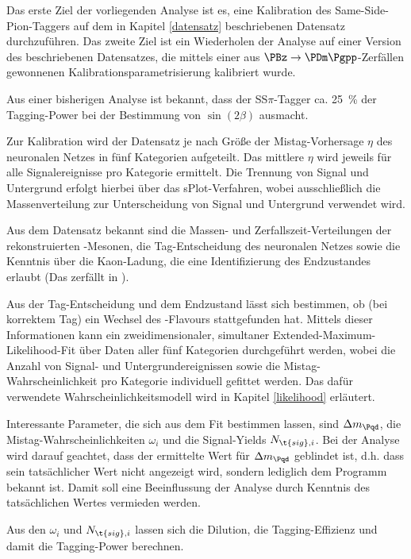 Das erste Ziel der vorliegenden Analyse ist es, eine Kalibration des Same-Side-Pion-Taggers auf dem in Kapitel \ref{datensatz} beschriebenen Datensatz durchzuführen.
Das zweite Ziel ist ein Wiederholen der Analyse auf einer Version des beschriebenen Datensatzes, die mittels einer aus $\PBz \to \PDm\Pgpp$-Zerfällen gewonnenen Kalibrationsparametrisierung kalibriert wurde.

Aus einer bisherigen Analyse ist bekannt, dass der SS$π$-Tagger ca. \SI{25}{\percent} der Tagging-Power bei der Bestimmung von $\sin(2β)$ ausmacht.

Zur Kalibration wird der Datensatz je nach Größe der Mistag-Vorhersage $η$ des neuronalen Netzes in fünf Kategorien aufgeteilt.
Das mittlere $η$ wird jeweils für alle Signalereignisse pro Kategorie ermittelt.
Die Trennung von Signal und Untergrund erfolgt hierbei über das sPlot-Verfahren\cite{splot}, wobei ausschließlich die Massenverteilung zur Unterscheidung von Signal und Untergrund verwendet wird.

Aus dem Datensatz bekannt sind die Massen- und Zerfallszeit-Verteilungen der rekonstruierten \PB-Mesonen, die Tag-Entscheidung des neuronalen Netzes sowie die Kenntnis über die Kaon-Ladung, die eine Identifizierung des Endzustandes erlaubt (Das \PKst zerfällt in \PKp\Pgpm).

Aus der Tag-Entscheidung und dem Endzustand lässt sich bestimmen, ob (bei korrektem Tag) ein Wechsel des \Pqb-Flavours stattgefunden hat.
Mittels dieser Informationen kann ein zweidimensionaler, simultaner Extended-Maximum-Likelihood-Fit über Daten aller fünf Kategorien durchgeführt werden, wobei die Anzahl von Signal- und Untergrundereignissen sowie die Mistag-Wahrscheinlichkeit pro Kategorie individuell gefittet werden.
Das dafür verwendete Wahrscheinlichkeitsmodell wird in Kapitel \ref{likelihood} erläutert.

Interessante Parameter, die sich aus dem Fit bestimmen lassen, sind $\difference{m_{\Pqd}}$, die Mistag-Wahrscheinlichkeiten $ω_i$ und die Signal-Yields $N_{\t{sig},i}$.
Bei der Analyse wird darauf geachtet, dass der ermittelte Wert für $\difference{m_{\Pqd}}$ geblindet ist, d.h. dass sein tatsächlicher Wert nicht angezeigt wird, sondern lediglich dem Programm bekannt ist.
Damit soll eine Beeinflussung der Analyse durch Kenntnis des tatsächlichen Wertes vermieden werden.

Aus den $ω_i$ und $N_{\t{sig},i}$ lassen sich die Dilution, die Tagging-Effizienz und damit die Tagging-Power berechnen.

